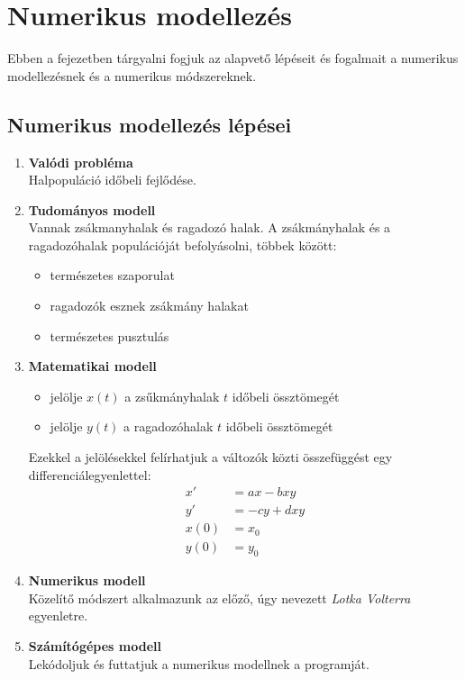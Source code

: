 \chapter{Numerikus modellezés}
Ebben a fejezetben tárgyalni fogjuk az alapvető lépéseit és fogalmait a numerikus modellezésnek és a numerikus módszereknek.

\section{Numerikus modellezés lépései}
\begin{enumerate}
    \item \textbf{Valódi probléma} \\
    Halpopuláció időbeli fejlődése.

    \item \textbf{Tudományos modell} \\
    Vannak zsákmanyhalak és ragadozó halak. A zsákmányhalak és a ragadozóhalak populációját befolyásolni, többek között:
    \begin{itemize}
        \item természetes szaporulat
        \item ragadozók esznek zsákmány halakat
        \item természetes pusztulás
    \end{itemize}

    \item \textbf{Matematikai modell}
    \begin{itemize}
        \item jelölje $x(t)$ a zsűkmányhalak $t$ időbeli össztömegét
        \item jelölje $y(t)$ a ragadozóhalak $t$ időbeli össztömegét
    \end{itemize}
    Ezekkel a jelölésekkel felírhatjuk a változók közti összefüggést egy differenciálegyenlettel:
    \begin{align*}
        x' & = ax - bxy \\
        y' & = -cy + dxy \\
        x(0) & = x_{0} \\
        y(0) & = y_{0}
    \end{align*}

    \item \textbf{Numerikus modell} \\
    Közelítő módszert alkalmazunk az előző, úgy nevezett \textit{Lotka Volterra} egyenletre.

    \item \textbf{Számítógépes modell} \\
    Lekódoljuk és futtatjuk a numerikus modellnek a programját.
\end{enumerate}

